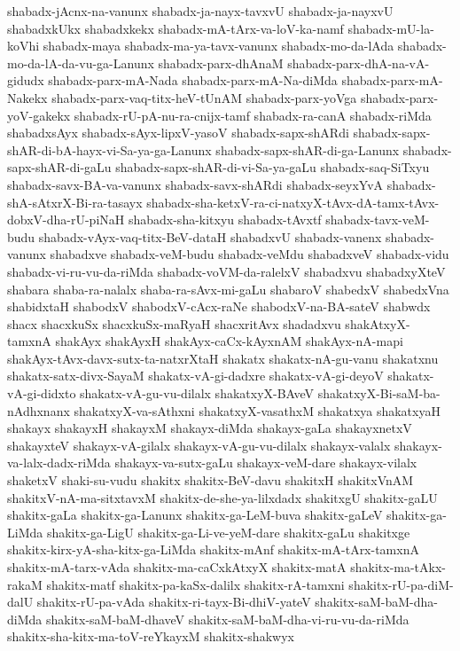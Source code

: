 {shabadx-jAcnx-na-vanunx
shabadx-ja-nayx-tavxvU
shabadx-ja-nayxvU
shabadxkUkx
shabadxkekx
shabadx-mA-tArx-va-loV-ka-namf
shabadx-mU-la-koVhi
shabadx-maya
shabadx-ma-ya-tavx-vanunx
shabadx-mo-da-lAda
shabadx-mo-da-lA-da-vu-ga-Lanunx
shabadx-parx-dhAnaM
shabadx-parx-dhA-na-vA-gidudx
shabadx-parx-mA-Nada
shabadx-parx-mA-Na-diMda
shabadx-parx-mA-Nakekx
shabadx-parx-vaq-titx-heV-tUnAM
shabadx-parx-yoVga
shabadx-parx-yoV-gakekx
shabadx-rU-pA-nu-ra-cnijx-tamf
shabadx-ra-canA
shabadx-riMda
shabadxsAyx
shabadx-sAyx-lipxV-yasoV
shabadx-sapx-shARdi
shabadx-sapx-shAR-di-bA-hayx-vi-Sa-ya-ga-Lanunx
shabadx-sapx-shAR-di-ga-Lanunx
shabadx-sapx-shAR-di-gaLu
shabadx-sapx-shAR-di-vi-Sa-ya-gaLu
shabadx-saq-SiTxyu
shabadx-savx-BA-va-vanunx
shabadx-savx-shARdi
shabadx-seyxYvA
shabadx-shA-sAtxrX-Bi-ra-tasayx
shabadx-sha-ketxV-ra-ci-natxyX-tAvx-dA-tamx-tAvx-dobxV-dha-rU-piNaH
shabadx-sha-kitxyu
shabadx-tAvxtf
shabadx-tavx-veM-budu
shabadx-vAyx-vaq-titx-BeV-dataH
shabadxvU
shabadx-vanenx
shabadx-vanunx
shabadxve
shabadx-veM-budu
shabadx-veMdu
shabadxveV
shabadx-vidu
shabadx-vi-ru-vu-da-riMda
shabadx-voVM-da-ralelxV
shabadxvu
shabadxyXteV
shabara
shaba-ra-nalalx
shaba-ra-sAvx-mi-gaLu
shabaroV
shabedxV
shabedxVna
shabidxtaH
shabodxV
shabodxV-cAcx-raNe
shabodxV-na-BA-sateV
shabwdx
shacx
shacxkuSx
shacxkuSx-maRyaH
shacxritAvx
shadadxvu
shakAtxyX-tamxnA
shakAyx
shakAyxH
shakAyx-caCx-kAyxnAM
shakAyx-nA-mapi
shakAyx-tAvx-davx-sutx-ta-natxrXtaH
shakatx
shakatx-nA-gu-vanu
shakatxnu
shakatx-satx-divx-SayaM
shakatx-vA-gi-dadxre
shakatx-vA-gi-deyoV
shakatx-vA-gi-didxto
shakatx-vA-gu-vu-dilalx
shakatxyX-BAveV
shakatxyX-Bi-saM-ba-nAdhxnanx
shakatxyX-va-sAthxni
shakatxyX-vasathxM
shakatxya
shakatxyaH
shakayx
shakayxH
shakayxM
shakayx-diMda
shakayx-gaLa
shakayxnetxV
shakayxteV
shakayx-vA-gilalx
shakayx-vA-gu-vu-dilalx
shakayx-valalx
shakayx-va-lalx-dadx-riMda
shakayx-va-sutx-gaLu
shakayx-veM-dare
shakayx-vilalx
shaketxV
shaki-su-vudu
shakitx
shakitx-BeV-davu
shakitxH
shakitxVnAM
shakitxV-nA-ma-sitxtavxM
shakitx-de-she-ya-lilxdadx
shakitxgU
shakitx-gaLU
shakitx-gaLa
shakitx-ga-Lanunx
shakitx-ga-LeM-buva
shakitx-gaLeV
shakitx-ga-LiMda
shakitx-ga-LigU
shakitx-ga-Li-ve-yeM-dare
shakitx-gaLu
shakitxge
shakitx-kirx-yA-sha-kitx-ga-LiMda
shakitx-mAnf
shakitx-mA-tArx-tamxnA
shakitx-mA-tarx-vAda
shakitx-ma-caCxkAtxyX
shakitx-matA
shakitx-ma-tAkx-rakaM
shakitx-matf
shakitx-pa-kaSx-dalilx
shakitx-rA-tamxni
shakitx-rU-pa-diM-dalU
shakitx-rU-pa-vAda
shakitx-ri-tayx-Bi-dhiV-yateV
shakitx-saM-baM-dha-diMda
shakitx-saM-baM-dhaveV
shakitx-saM-baM-dha-vi-ru-vu-da-riMda
shakitx-sha-kitx-ma-toV-reYkayxM
shakitx-shakwyx
}
